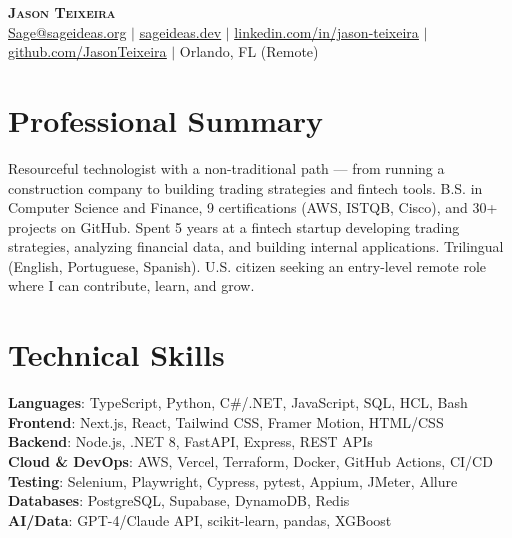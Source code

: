\documentclass[letterpaper,11pt]{article}
\begin{document}
\begin{center}
    \textbf{\Huge \scshape Jason Teixeira} \\ \vspace{1pt}
    \small \href{mailto:Sage@sageideas.org}{ \underline{Sage@sageideas.org}} $|$
    \href{https://sageideas.dev}{ \underline{sageideas.dev}} $|$
    \href{https://www.linkedin.com/in/jason-teixeira/}{ \underline{linkedin.com/in/jason-teixeira}} $|$
    \href{https://github.com/JasonTeixeira}{ \underline{github.com/JasonTeixeira}} $|$
    Orlando, FL (Remote)
\end{center}

\section{Professional Summary}
  \small{Resourceful technologist with a non-traditional path --- from running a construction company to building trading strategies and fintech tools. B.S. in Computer Science and Finance, 9 certifications (AWS, ISTQB, Cisco), and 30+ projects on GitHub. Spent 5 years at a fintech startup developing trading strategies, analyzing financial data, and building internal applications. Trilingual (English, Portuguese, Spanish). U.S. citizen seeking an entry-level remote role where I can contribute, learn, and grow.}

\section{Technical Skills}
 \begin{itemize}[leftmargin=0.15in, label={}]
    \small{\item{
     \textbf{Languages}{: TypeScript, Python, C\#/.NET, JavaScript, SQL, HCL, Bash} \\
     \textbf{Frontend}{: Next.js, React, Tailwind CSS, Framer Motion, HTML/CSS} \\
     \textbf{Backend}{: Node.js, .NET 8, FastAPI, Express, REST APIs} \\
     \textbf{Cloud \& DevOps}{: AWS, Vercel, Terraform, Docker, GitHub Actions, CI/CD} \\
     \textbf{Testing}{: Selenium, Playwright, Cypress, pytest, Appium, JMeter, Allure} \\
     \textbf{Databases}{: PostgreSQL, Supabase, DynamoDB, Redis} \\
     \textbf{AI/Data}{: GPT-4/Claude API, scikit-learn, pandas, XGBoost}
    }}
 \end{itemize}
\end{document}
